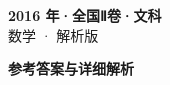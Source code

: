 \documentclass[zihao=-4, a4paper]{ctexart}
\begin{document}
\begin{center}
  {\Large\bfseries 2016 年·全国Ⅱ卷·文科}\\[4pt]
  {\large 数学 · 解析版}
\end{center}
\medskip
{}

\clearpage
{}
\begin{center}{\Large\bfseries 参考答案与详细解析}\end{center}
\medskip

\end{document}
